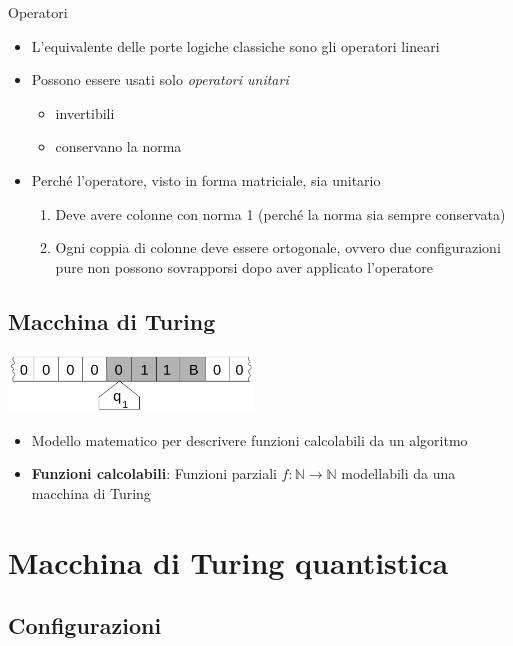 \documentclass{beamer}
\begin{document}
\begin{frame}{\subsecname}{Operatori}
	\begin{itemize}
		\item L'equivalente delle porte logiche classiche sono gli operatori lineari
		\item Possono essere usati solo \textit{operatori unitari}
		\begin{itemize}
			\item invertibili
			\item conservano la norma
		\end{itemize}
		\item Perché l'operatore, visto in forma matriciale, sia unitario
		\begin{enumerate}
			\item Deve avere colonne con norma 1 (perché la norma sia sempre conservata)
			\item Ogni coppia di colonne deve essere ortogonale, ovvero due configurazioni pure non possono sovrapporsi dopo aver applicato l'operatore
		\end{enumerate}
	\end{itemize}
\end{frame}

\subsection{Macchina di Turing}

\begin{frame}{\subsecname}{}
	\centering\includegraphics[width=6.5cm]{Turing_machine_2b.png}
	\begin{itemize}
		\item Modello matematico per descrivere funzioni calcolabili da un algoritmo
		\item \textbf{Funzioni calcolabili}: Funzioni parziali \( f : \mathbb{N} \rightarrow \mathbb{N} \) modellabili da una macchina di Turing
	\end{itemize}
\end{frame}

\section{Macchina di Turing quantistica}

\subsection{Configurazioni}
\end{document}
